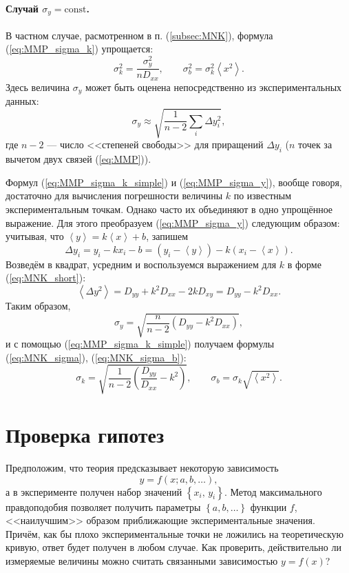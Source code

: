 \paragraph{Случай $\sigma_{y}=\mathrm{const}$.}

В частном случае, расмотренном в п. (\ref{subsec:MNK}),
формула (\ref{eq:MMP_sigma_k}) упрощается:
\begin{equation}
\boxed{\sigma_{k}^{2}=\frac{\sigma_{y}^{2}}{nD_{xx}},\qquad\sigma_{b}^{2}=\sigma_{k}^{2}\left\langle x^{2}\right\rangle }.\label{eq:MMP_sigma_k_simple}
\end{equation}
Здесь величина $\sigma_{y}$ может быть оценена непосредственно из
экспериментальных данных:
\begin{equation}
\sigma_{y}\approx\sqrt{\frac{1}{n-2}\sum_{i}\Delta y_{i}^{2}},\label{eq:MMP_sigma_y}
\end{equation}
где $n-2$ --- число <<степеней свободы>>
для приращений $\Delta y_{i}$ ($n$ точек за вычетом двух связей
(\ref{eq:MMP})).

Формул (\ref{eq:MMP_sigma_k_simple}) и (\ref{eq:MMP_sigma_y}),
вообще говоря, достаточно для вычисления погрешности величины $k$
по известным экспериментальным точкам. Однако часто их объединяют
в одно упрощённое выражение. Для этого преобразуем (\ref{eq:MMP_sigma_y})
следующим образом: учитывая, что $\left\langle y\right\rangle =k\left\langle x\right\rangle +b$,
запишем 
\[
\Delta y_{i}=y_{i}-kx_{i}-b=\left(y_{i}-\left\langle y\right\rangle \right)-k\left(x_{i}-\left\langle x\right\rangle \right).
\]
Возведём в квадрат, усредним и воспользуемся выражением для $k$ в
форме (\ref{eq:MNK_short}):
\[
\left\langle \Delta y^{2}\right\rangle =D_{yy}+k^{2}D_{xx}-2kD_{xy}=D_{yy}-k^{2}D_{xx}.
\]
Таким образом, 
\[
\sigma_{y}=\sqrt{\frac{n}{n-2}\left(D_{yy}-k^{2}D_{xx}\right)},
\]
и с помощью (\ref{eq:MMP_sigma_k_simple}) получаем формулы (\ref{eq:MNK_sigma}),
(\ref{eq:MNK_sigma_b}):
\[
\boxed{\sigma_{k}=\sqrt{\frac{1}{n-2}\left(\frac{D_{yy}}{D_{xx}}-k^{2}\right)},\qquad\sigma_{b}=\sigma_{k}\sqrt{\left\langle x^{2}\right\rangle }}.
\]

\section{{\small{}Проверка гипотез}}

Предположим, что теория предсказывает некоторую зависимость
\[
y=f\!\left(x;a,b,\ldots\right),
\]
а в эксперименте получен набор значений $\left\{ x_{i},\,y_{i}\right\} $.
Метод максимального правдоподобия позволяет получить параметры $\left\{ a,b,\ldots\right\} $
функции $f$, <<наилучшим>> образом приближающие
экспериментальные значения. Причём, как бы плохо экспериментальные
точки не ложились на теоретическую кривую, ответ будет получен в любом
случае. Как проверить, действительно ли измеряемые величины можно
считать связанными зависимостью $y=f\!\left(x\right)$?

